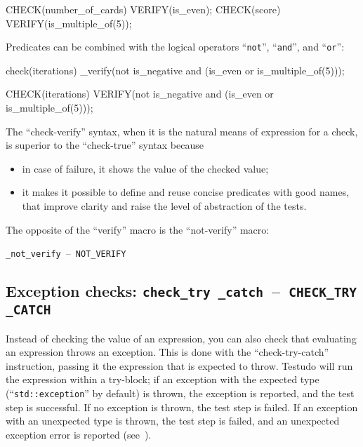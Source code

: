 \documentclass[twoside, a4paper, article]{memoir}
\newcommand*\testudocolor{\color{red!80!blue}}
\newcommand*\testudo[1]{\texttt{\testudocolor{}#1}}
\newcommand*\testudopair[2]{\testudo{#1}~--~\testudo{#2}}
\begin{document}
\begin{cpplisting}
CHECK(number_of_cards) VERIFY(is_even);
CHECK(score) VERIFY(is_multiple_of(5));
\end{cpplisting}

Predicates can be combined with the logical operators ``\texttt{not}'',
``\texttt{and}'', and ``\texttt{or}'':
\begin{cpplisting}
check(iterations)
  _verify(not is_negative
          and (is_even or is_multiple_of(5)));
\end{cpplisting}

\begin{cpplisting}
CHECK(iterations)
  VERIFY(not is_negative
         and (is_even or is_multiple_of(5)));
\end{cpplisting}

The ``check-verify'' syntax, when it is the natural means of expression for a
check, is superior to the ``check-true'' syntax because
\begin{itemize}
\item in case of failure, it shows the value of the checked value;
\item it makes it possible to define and reuse concise predicates with good
  names, that improve clarity and raise the level of abstraction of the tests.
\end{itemize}

The opposite of the ``verify'' macro is the ``not-verify'' macro:
\begin{center}
  \testudopair{\_not\_verify}{NOT\_VERIFY}
\end{center}

\subsection{Exception checks:
  \testudopair{check\_try \_catch}{CHECK\_TRY \_CATCH}}
\label{sec:exception-checks}

Instead of checking the value of an expression, you can also check that
evaluating an expression throws an exception.  This is done with the
``check-try-catch'' instruction, passing it the expression that is expected to
throw.  Testudo will run the expression within a try-block; if an exception
with the expected type (``\texttt{std::exception}'' by default) is thrown, the
exception is reported, and the test step is successful.  If no exception is
thrown, the test step is failed. If an exception with an unexpected type is
thrown, the test step is failed, and an unexpected exception error is reported
(see~).
\end{document}
